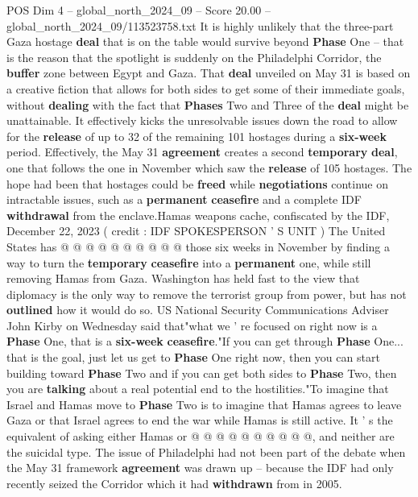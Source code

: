 \begin{textsample}{POS Dim 4 – global\_north\_2024\_09 – Score 20.00 – global\_north\_2024\_09/113523758.txt}  \label{ex:f4_pos_317}
It is highly unlikely that the three-part Gaza hostage \textbf{deal} that is on the table would survive beyond \textbf{Phase} One -- that is the reason that the spotlight is suddenly on the Philadelphi Corridor, the \textbf{buffer} zone between Egypt and Gaza.
That \textbf{deal} unveiled on May 31 is based on a creative fiction that allows for both sides to get some of their immediate goals, without \textbf{dealing} with the fact that \textbf{Phases} Two and Three of the \textbf{deal} might be unattainable.
It effectively kicks the unresolvable issues down the road to allow for the \textbf{release} of up to 32 of the remaining 101 hostages during a \textbf{six-week} period.
Effectively, the May 31 \textbf{agreement} creates a second \textbf{temporary} \textbf{deal}, one that follows the one in November which saw the \textbf{release} of 105 hostages.
The hope had been that hostages could be \textbf{freed} while \textbf{negotiations} continue on intractable issues, such as a \textbf{permanent} \textbf{ceasefire} and a complete IDF \textbf{withdrawal} from the enclave.Hamas weapons cache, confiscated by the IDF, December 22, 2023 ( credit : IDF SPOKESPERSON ' S UNIT ) The United States has @ @ @ @ @ @ @ @ @ @ those six weeks in November by finding a way to turn the \textbf{temporary} \textbf{ceasefire} into a \textbf{permanent} one, while still removing Hamas from Gaza.
Washington has held fast to the view that diplomacy is the only way to remove the terrorist group from power, but has not \textbf{outlined} how it would do so.
US National Security Communications Adviser John Kirby on Wednesday said that"what we ' re focused on right now is a \textbf{Phase} One, that is a \textbf{six-week} \textbf{ceasefire}."If you can get through \textbf{Phase} One... that is the goal, just let us get to \textbf{Phase} One right now, then you can start building toward \textbf{Phase} Two and if you can get both sides to \textbf{Phase} Two, then you are \textbf{talking} about a real potential end to the hostilities."To imagine that Israel and Hamas move to \textbf{Phase} Two is to imagine that Hamas agrees to leave Gaza or that Israel agrees to end the war while Hamas is still active.
It ' s the equivalent of asking either Hamas or @ @ @ @ @ @ @ @ @ @, and neither are the suicidal type.
The issue of Philadelphi had not been part of the debate when the May 31 framework \textbf{agreement} was drawn up -- because the IDF had only recently seized the Corridor which it had \textbf{withdrawn} from in 2005.

\end{textsample}

